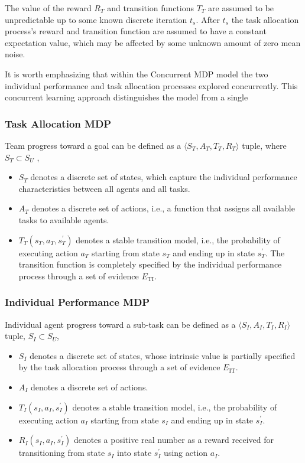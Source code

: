 \documentclass[compsoc,journal,letterpaper,10pt,draftcls,twocolumn]{IEEEtran}
\begin{document}
The value of the reward \(R_{T}\) and transition functions \(T_{T}\) are
assumed to be unpredictable up to some known discrete iteration
\(t_{s}\). After \(t_{s}\) the task allocation process's reward and
transition function are assumed to have a constant expectation value,
which may be affected by some unknown amount of zero mean noise.

It is worth emphasizing that within the Concurrent MDP model the two
individual performance and task allocation processes explored
concurrently. This concurrent learning approach distinguishes the model
from a single

\subsubsection{Task Allocation MDP}\label{task-allocation-mdp}

Team progress toward a goal can be defined as a
\( \langle S_{T}, A_{T}, T_{T}, R_{T} \rangle \) tuple, where\(S_{T} \subset S_{U}\) ,

\begin{itemize}
\item
  \(S_{T}\) denotes a discrete set of states, which capture the
  individual performance characteristics between all agents and all
  tasks.
\item
  \(A_{T}\) denotes a discrete set of actions, i.e., a function that
  assigns all available tasks to available agents.
\item
  \(T_{T}\left( s_{T}, a_{T}, s_{T}^{'} \right)\) denotes a stable
  transition model, i.e., the probability of executing action \(a_{T}\)
  starting from state \(s_{T}\) and ending up in state \(s_{T}^{'}\).
  The transition function is completely specified by the individual
  performance process through a set of evidence \(E_{\text{TI}}\).
\end{itemize}

\subsubsection{Individual Performance
MDP}\label{individual-performance-mdp}

Individual agent progress toward a sub-task can be defined as a
\( \langle S_{I}, A_{I}, T_{I}, R_{I} \rangle \) tuple, \(S_{I} \subset S_{U}\),

\begin{itemize}
\item
  \(S_{I}\) denotes a discrete set of states, whose intrinsic value is
  partially specified by the task allocation process through a set of
  evidence \(E_{\text{IT}}\).
\item
  \(A_{I}\) denotes a discrete set of actions.
\item
  \(T_{I}\left( s_{I}, a_{I}, s_{I}^{'} \right)\) denotes a stable
  transition model, i.e., the probability of executing action \(a_{I}\)
  starting from state \(s_{I}\) and ending up in state \(s_{I}^{'}\).
\item
  \(R_{I}(s_{I},a_{I},s_{I}^{'})\) denotes a positive real number as a
  reward received for transitioning from state \(s_{I}\) into state
  \(s_{I}^{'}\) using action \(a_{I}\).
\end{itemize}
\end{document}
